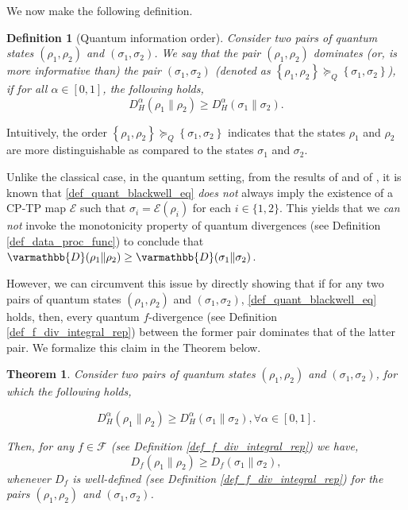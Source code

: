 \documentclass[onecolumn,ldraftcls, 11pt]{IEEEtran}
\newtheorem{theorem}{\bf{Theorem}}
\newcommand*{\cF}{\mathcal{F}}
\newcommand*{\cE}{\mathcal{E}}
\newtheorem{definition}{Definition}
\begin{document}
We now make the following definition.

\begin{definition}[Quantum information  order]\label{def_quant_blackwell}
    Consider two pairs of quantum states $(\rho_1,\rho_2)$ and  $(\sigma_1,\sigma_2)$. We say that the pair $\left(\rho_1,\rho_2\right)$ dominates (or, is more informative than) the  pair $\left(\sigma_1,\sigma_2\right)$ (denoted as $\left\{\rho_1,\rho_2\right\} \succeq_{Q} \left\{\sigma_1,\sigma_2\right\}$), if for all $\alpha \in [0,1]$, the following holds,
    \begin{equation}
        D^{\alpha}_{H}{(\rho_1\|\rho_2)} \geq D^{\alpha}_{H}{(\sigma_1\|\sigma_2)}.\label{def_quant_blackwell_eq}
    \end{equation}
\end{definition}

 Intuitively, the order $\left\{\rho_1,\rho_2\right\} \succeq_{Q} \left\{\sigma_1,\sigma_2\right\}$ indicates that the states $\rho_1$ and $\rho_2$ are more distinguishable as compared to the states $\sigma_1$ and $\sigma_2$. 

Unlike the classical case, in the quantum setting, from the results of \cite{Matsumoto2014} and  of \cite[Lemma $18$ \& Corollary $19$]{GLW24}, it is known that \eqref{def_quant_blackwell_eq} \textit{does not} always imply the existence of a CP-TP map $\cE$ such that $\sigma_i = \cE(\rho_i)$ for each $i \in \{1,2\}$. This yields that we \textit{can not} invoke the monotonicity property of quantum divergences (see Definition \ref{def_data_proc_func}) to conclude that $\varmathbb{D}(\rho_1\| \rho_2) \geq \varmathbb{D}(\sigma_1\| \sigma_2)$.

However, we can circumvent this issue by directly showing that if for any two pairs of quantum states  $(\rho_1,\rho_2)$ and $(\sigma_1,\sigma_2)$, \eqref{def_quant_blackwell_eq} holds, then, every quantum $f$-divergence (see Definition \ref{def_f_div_integral_rep}) between the former pair dominates that of the latter pair. We formalize this claim in the Theorem below.


 \begin{theorem}\label{lemma_t_hyp_F_Div}
    Consider two pairs of quantum states  $(\rho_1,\rho_2)$ and $(\sigma_1,\sigma_2)$, for which the following holds,

\begin{equation}
    D^{\alpha}_{H}{(\rho_1\|\rho_2)} \geq D^{\alpha}_{H}{(\sigma_1\|\sigma_2)}, \forall \alpha \in [0,1].\label{lemma_t_hyp_F_div_eq}
\end{equation}

Then, for any $f \in \cF$ (see Definition \ref{def_f_div_integral_rep}) we have, 
$$D_f(\rho_1\|\rho_2) \geq  D_f(\sigma_1\|\sigma_2),$$ whenever $D_f$ is well-defined (see Definition \ref{def_f_div_integral_rep}) for the pairs $(\rho_1,\rho_2)$ and $(\sigma_1,\sigma_2)$.
\end{theorem}
\end{document}
